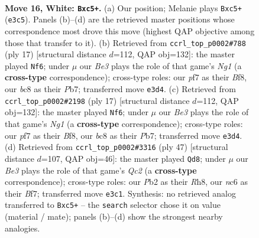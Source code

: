 \documentclass[11pt]{article}
\begin{document}
\clearpage

\begin{figure}[p]\centering
\begin{subfigure}{0.46\textwidth}\centering
\resizebox{\linewidth}{!}{%
\newchessgame
\chessboard[
  setfen={r1bq1k2/pp1n1pp1/2n1p3/2bpP3/Q4P1r/P3B3/1P4PP/R3KNNR w KQ - 5 16},
  showmover=false,
  pgfstyle=straightmove, color=movearrow, markmove={e3-c5}
]}
\caption{}
\end{subfigure}\hfill
\begin{subfigure}{0.46\textwidth}\centering
\resizebox{\linewidth}{!}{%
\newchessgame
\chessboard[
  setfen={r3kbnr/pp3ppp/2n1p3/q2p4/3P4/2NB1Q1P/PPPB1PP1/R3K2R b KQkq - 3 9},
  showmover=false,
  pgfstyle=straightmove, color=movearrow, markmove={g8-f6}
]}
\caption{}
\end{subfigure}
\\[4pt]
\begin{subfigure}{0.46\textwidth}\centering
\resizebox{\linewidth}{!}{%
\newchessgame
\chessboard[
  setfen={r3kbnr/pp3ppp/2n1p3/q2p4/3P4/2NB1Q1P/PPPB1PP1/R3K2R b KQkq - 3 9},
  showmover=false,
  pgfstyle=straightmove, color=movearrow, markmove={g8-f6}
]}
\caption{}
\end{subfigure}\hfill
\begin{subfigure}{0.46\textwidth}\centering
\resizebox{\linewidth}{!}{%
\newchessgame
\chessboard[
  setfen={k4r1r/1pqn1bR1/p1p1pn1p/2Pp3P/8/P3B1NB/1PPQ1P2/2K4R b - - 0 24},
  showmover=false,
  pgfstyle=straightmove, color=movearrow, markmove={c7-d8}
]}
\caption{}
\end{subfigure}
\caption{\textbf{Move 16, White: \texttt{Bxc5+}.} (a) Our position; Melanie plays \texttt{Bxc5+} (\texttt{e3c5}). Panels (b)--(d) are the retrieved master positions whose correspondence most drove this move (highest QAP objective among those that transfer to it). (b) Retrieved from \texttt{ccrl\_top\_p0002\#788} (ply 17) [structural distance $d$=112, QAP obj=132]: the master played \texttt{Nf6}; under $\mu$ our \emph{Be3} plays the role of that game's \emph{Ng1} (a \textbf{cross-type} correspondence); cross-type roles: our \emph{p}f7 as their \emph{B}f8, our \emph{b}c8 as their \emph{P}b7; transferred move \texttt{e3d4}. (c) Retrieved from \texttt{ccrl\_top\_p0002\#2198} (ply 17) [structural distance $d$=112, QAP obj=132]: the master played \texttt{Nf6}; under $\mu$ our \emph{Be3} plays the role of that game's \emph{Ng1} (a \textbf{cross-type} correspondence); cross-type roles: our \emph{p}f7 as their \emph{B}f8, our \emph{b}c8 as their \emph{P}b7; transferred move \texttt{e3d4}. (d) Retrieved from \texttt{ccrl\_top\_p0002\#3316} (ply 47) [structural distance $d$=107, QAP obj=46]: the master played \texttt{Qd8}; under $\mu$ our \emph{Be3} plays the role of that game's \emph{Qc2} (a \textbf{cross-type} correspondence); cross-type roles: our \emph{P}b2 as their \emph{R}h8, our \emph{n}c6 as their \emph{B}f7; transferred move \texttt{e3c1}. Synthesis: no retrieved analog transferred to \texttt{Bxc5+} -- the \texttt{search} selector chose it on value (material / mate); panels (b)--(d) show the strongest nearby analogies.}
\label{fig:thought-m30}
\end{figure}
\end{document}
